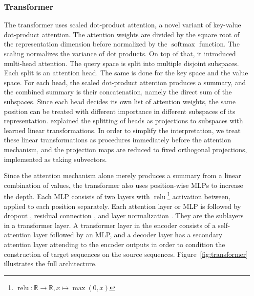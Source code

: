 \documentclass[11pt]{article}
\DeclareMathOperator{\softmax}{softmax}
\DeclareMathOperator{\relu}{relu}
\begin{document}
\subsubsection*{Transformer}

The transformer uses scaled dot-product attention,
a novel variant of key-value dot-product attention.
The attention weights are divided by the square root of the representation dimension
before normalized by the \(\softmax\) function.
The scaling normalizes the variance of dot products.
On top of that, it introduced multi-head attention.
The query space is split into multiple disjoint subspaces.
Each split is an attention head.
The same is done for the key space and the value space.
For each head, the scaled dot-product attention produces a summary,
and the combined summary is their concatenation,
namely the direct sum of the subspaces.
Since each head decides its own list of attention weights,
the same position can be treated with different importance in different subspaces of its representation.
\textcite{vaswani2017attention} explained the splitting of heads
as projections to subspaces with learned linear transformations.
In order to simplify the interpretation,
we treat these linear transformations as procedures immediately before the attention mechanism,
and the projection maps are reduced to fixed orthogonal projections,
implemented as taking subvectors.

Since the attention mechanism alone merely produces a summary from a linear combination of values,
the transformer also uses position-wise MLPs to increase the depth.
Each MLP consists of two layers with
\(\relu\)\footnote{\(\relu : \mathbb{R} \to \mathbb{R}, x \mapsto \max(0, x)\)} activation between,
applied to each position separately.
Each attention layer or MLP is followed by dropout \parencite{srivastava2014dropout},
residual connection \parencite{he2016deep}, and layer normalization \parencite{ba2016layer}.
They are the sublayers in a transformer layer.
A transformer layer in the encoder consists of a self-attention layer followed by an MLP,
and a decoder layer has a secondary attention layer attending to the encoder outputs
in order to condition the construction of target sequences on the source sequences.
Figure~\ref{fig:transformer} illustrates the full architecture.
\end{document}
